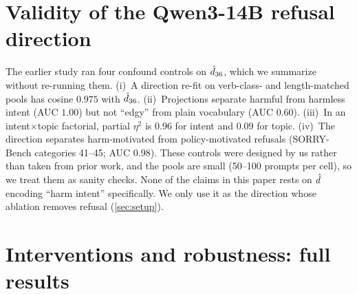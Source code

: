 \section{Validity of the Qwen3-14B refusal direction}
\label{app:validity}

The earlier study ran four confound controls on $\hat{d}_{36}$, which we summarize without re-running them.
(i)~A direction re-fit on verb-class- and length-matched pools has cosine $0.975$ with $\hat{d}_{36}$.
(ii)~Projections separate harmful from harmless intent (AUC $1.00$) but not ``edgy'' from plain vocabulary
(AUC $0.60$). (iii)~In an intent$\times$topic factorial, partial $\eta^2$ is $0.96$ for intent and $0.09$ for
topic. (iv)~The direction separates harm-motivated from policy-motivated refusals (SORRY-Bench categories
41--45; AUC $0.98$). These controls were designed by us rather than taken from prior work, and the pools are
small (50--100 prompts per cell), so we treat them as sanity checks. None of the claims in this paper rests
on $\dhat$ encoding ``harm intent'' specifically. We only use it as the direction whose ablation removes
refusal (\cref{sec:setup}).

\section{Interventions and robustness: full results}
\label{app:causal}

\begin{table}[h]
\centering\small
\caption{Plain list versus framings in the style of SequentialBreak (8 items, 100 JailbreakBench targets).
Cells: HarmBench ASR / refusal in the first 24 tokens, in \%. ``Late'': fifth of eight items.}
\label{tab:framing}
\resizebox{\linewidth}{!}{}
\end{table}

\begin{table}[h]
\centering\small
\caption{Kinds of benign items around the harmful request (8 items, harmful item in the middle or last; 400
responses per cell). Cells in \%.}
\label{tab:content}
\end{table}


\begin{table}[h]
\centering\small
\caption{Directional ablation of $\dhat$ restricted to prompt positions, generated positions, or all positions;
free greedy generation of the full response (100 targets, harmful item last). Cells: target refused / ASR, in \%.}
\label{tab:ablate}
\resizebox{\linewidth}{!}{}
\end{table}

